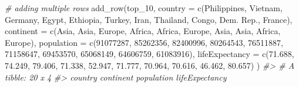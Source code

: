 \documentclass[
]{book}
\newenvironment{Shaded}{\begin{snugshade}}{\end{snugshade}}
\newcommand{\AttributeTok}[1]{\textcolor[rgb]{0.77,0.63,0.00}{#1}}
\newcommand{\CommentTok}[1]{\textcolor[rgb]{0.56,0.35,0.01}{\textit{#1}}}
\newcommand{\DecValTok}[1]{\textcolor[rgb]{0.00,0.00,0.81}{#1}}
\newcommand{\FloatTok}[1]{\textcolor[rgb]{0.00,0.00,0.81}{#1}}
\newcommand{\FunctionTok}[1]{\textcolor[rgb]{0.00,0.00,0.00}{#1}}
\newcommand{\NormalTok}[1]{#1}
\newcommand{\StringTok}[1]{\textcolor[rgb]{0.31,0.60,0.02}{#1}}
\begin{document}
\begin{Shaded}
\begin{Highlighting}[]
\CommentTok{\# adding multiple rows}
\FunctionTok{add\_row}\NormalTok{(top\_10, }
        \AttributeTok{country =} \FunctionTok{c}\NormalTok{(}\StringTok{\textquotesingle{}Philippines\textquotesingle{}}\NormalTok{, }\StringTok{\textquotesingle{}Vietnam\textquotesingle{}}\NormalTok{, }\StringTok{\textquotesingle{}Germany\textquotesingle{}}\NormalTok{, }\StringTok{\textquotesingle{}Egypt\textquotesingle{}}\NormalTok{, }\StringTok{\textquotesingle{}Ethiopia\textquotesingle{}}\NormalTok{, }
                    \StringTok{\textquotesingle{}Turkey\textquotesingle{}}\NormalTok{, }\StringTok{\textquotesingle{}Iran\textquotesingle{}}\NormalTok{, }\StringTok{\textquotesingle{}Thailand\textquotesingle{}}\NormalTok{, }\StringTok{\textquotesingle{}Congo, Dem. Rep.\textquotesingle{}}\NormalTok{, }\StringTok{\textquotesingle{}France\textquotesingle{}}\NormalTok{),}
        \AttributeTok{continent =} \FunctionTok{c}\NormalTok{(}\StringTok{\textquotesingle{}Asia\textquotesingle{}}\NormalTok{, }\StringTok{\textquotesingle{}Asia\textquotesingle{}}\NormalTok{, }\StringTok{\textquotesingle{}Europe\textquotesingle{}}\NormalTok{, }\StringTok{\textquotesingle{}Africa\textquotesingle{}}\NormalTok{, }\StringTok{\textquotesingle{}Africa\textquotesingle{}}\NormalTok{, }
                      \StringTok{\textquotesingle{}Europe\textquotesingle{}}\NormalTok{, }\StringTok{\textquotesingle{}Asia\textquotesingle{}}\NormalTok{, }\StringTok{\textquotesingle{}Asia\textquotesingle{}}\NormalTok{, }\StringTok{\textquotesingle{}Africa\textquotesingle{}}\NormalTok{, }\StringTok{\textquotesingle{}Europe\textquotesingle{}}\NormalTok{),}
        \AttributeTok{population =} \FunctionTok{c}\NormalTok{(}\DecValTok{91077287}\NormalTok{, }\DecValTok{85262356}\NormalTok{, }\DecValTok{82400996}\NormalTok{, }\DecValTok{80264543}\NormalTok{, }\DecValTok{76511887}\NormalTok{, }
                       \DecValTok{71158647}\NormalTok{, }\DecValTok{69453570}\NormalTok{, }\DecValTok{65068149}\NormalTok{, }\DecValTok{64606759}\NormalTok{, }\DecValTok{61083916}\NormalTok{),}
        \AttributeTok{lifeExpectancy =} \FunctionTok{c}\NormalTok{(}\FloatTok{71.688}\NormalTok{, }\FloatTok{74.249}\NormalTok{, }\FloatTok{79.406}\NormalTok{, }\FloatTok{71.338}\NormalTok{, }\FloatTok{52.947}\NormalTok{, }
                           \FloatTok{71.777}\NormalTok{, }\FloatTok{70.964}\NormalTok{, }\FloatTok{70.616}\NormalTok{, }\FloatTok{46.462}\NormalTok{, }\FloatTok{80.657}\NormalTok{)}
\NormalTok{       )}
\CommentTok{\#\textgreater{} \# A tibble: 20 x 4}
\CommentTok{\#\textgreater{}    country          continent population lifeExpectancy}

\end{Highlighting}
\end{Shaded}
\end{document}
